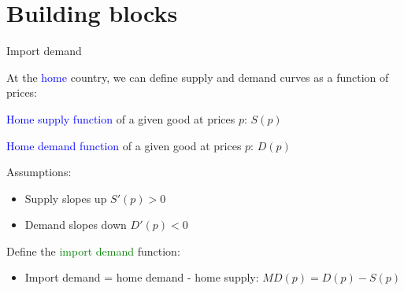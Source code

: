 \documentclass[notes,11pt, aspectratio=169, xcolor=table]{beamer}
\newcommand{\blue}[1]{\textcolor{blue}{#1}}
\newenvironment{wideitemize}{\itemize\addtolength{\itemsep}{10pt}}{\enditemize}
\begin{document}
\section{Building blocks}

\begin{frame}{Import demand}
\begin{wideitemize}
    \item At the \blue{home} country, we can define supply and demand curves as a function of prices:
    \item<2-> \blue{Home supply function} of a given good at prices $p$: $S(p)$
    \item<2-> \blue{Home demand function} of a given good at prices $p$: $D(p)$
    \item<3-> Assumptions:
    \begin{itemize}
        \item Supply slopes up $S'(p) > 0$
        \item Demand slopes down $D'(p) < 0$
    \end{itemize}
    \item<4-> Define the \textcolor{green}{import demand} function:
    \begin{itemize}
        \item Import demand = home demand - home supply: $MD(p) = D(p) - S(p)$ 
    \end{itemize}
\end{wideitemize}
    
\end{frame}
\end{document}

